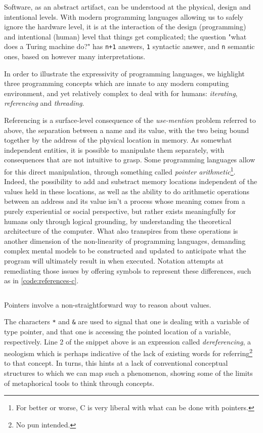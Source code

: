 Software, as an abstract artifact, can be understood at the physical, design and intentional levels\citep{moor_three_1978}. With modern programming languages allowing us to safely ignore the hardware level, it is at the interaction of the design (programming) and intentional (human) level that things get complicated; the question "what does a Turing machine do?" has \lstinline{n+1} answers, \lstinline{1} syntactic answer, and \lstinline{n} semantic ones, based on however many interpretations.

In order to illustrate the expressivity of programming languages, we highlight three programming concepts which are innate to any modern computing environment, and yet relatively complex to deal with for humans: \emph{iterating}, \emph{referencing} and \emph{threading}.

Referencing is a surface-level consequence of the \emph{use-mention} problem referred to above, the separation between a name and its value, with the two being bound together by the address of the physical location in memory. As somewhat independent entities, it is possible to manipulate them separately, with consequences that are not intuitive to grasp. Some programming languages allow for this direct manipulation, through something called \emph{pointer arithmetic}\footnote{For better or worse, C is very liberal with what can be done with pointers.}. Indeed, the possibility to add and substract memory locations independent of the values held in these locations, as well as the ability to do arithmetic operations between an address and its value isn't a process whose meaning comes from a purely experiential or social perspective, but rather exists meaningfully for humans only through logical grounding, by understanding the theoretical architecture of the computer. What also transpires from these operations is another dimension of the non-linearity of programming languages, demanding complex mental models to be constructed and updated to anticipate what the program will ultimately result in when executed. Notation attempts at remediating those issues by offering symbols to represent these differences, such as in \ref{code:references-c}.

\begin{listing}
  \inputminted{c}{./corpus/references.c}
  \caption{Pointers involve a non-straightforward way to reason about values.}
  \label{code:references-c}
\end{listing}

The characters \lstinline{*} and \lstinline{&} are used to signal that one is dealing with a variable of type pointer, and that one is accessing the pointed location of a variable, respectively. Line 2 of the snippet above is an expression called \emph{dereferencing}, a neologism which is perhaps indicative of the lack of existing words for referring\footnote{No pun intended.} to that concept. In turns, this hints at a lack of conventional conceptual structures to which we can map such a phenomenon, showing some of the limits of metaphorical tools to think through concepts.

